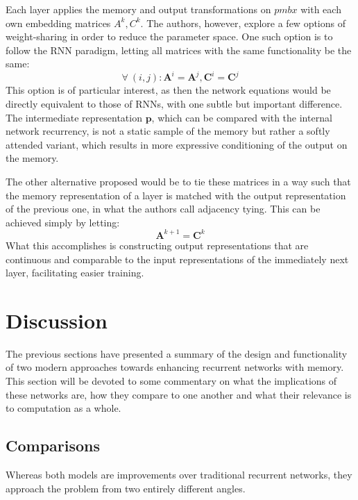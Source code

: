 \documentclass[]{article}
\begin{document}
Each layer applies the memory and output transformations on $pmb{x}$ with each own embedding matrices $A^k, C^k$. The authors, however, explore a few options of weight-sharing in order to reduce the parameter space. One such option is to follow the RNN paradigm, letting all matrices with the same functionality be the same:
\[
\tag{RNN-Tying}
\forall \ (i,j): \pmb{A}^i = \pmb{A}^j, \pmb{C}^i = \pmb{C}^j
\]
This option is of particular interest, as then the network equations would be directly equivalent to those of RNNs, with one subtle but important difference. The intermediate representation $\pmb{p}$, which can be compared with the internal network recurrency, is not a static sample of the memory but rather a softly attended variant, which results in more expressive conditioning of the output on the memory. 

The other alternative proposed would be to tie these matrices in a way such that the memory representation of a layer is matched with the output representation of the previous one, in what the authors call adjacency tying. This can be achieved simply by letting:
\[
\tag{Adjacency Tying}
\pmb{A}^{k+1} = \pmb{C}^k
\]
What this accomplishes is constructing output representations that are continuous and comparable to the input representations of the immediately next layer, facilitating easier training.

\section{Discussion}
\label{Comp}
The previous sections have presented a summary of the design and functionality of two modern approaches towards enhancing recurrent networks with memory. This section will be devoted to some commentary on what the implications of these networks are, how they compare to one another and what their relevance is to computation as a whole.

\subsection{Comparisons}
Whereas both models are improvements over traditional recurrent networks, they approach the problem from two entirely different angles. 
\end{document}
